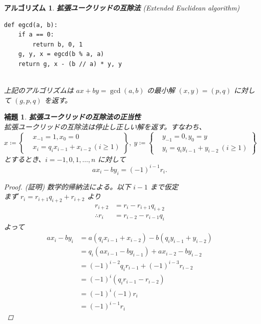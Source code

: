 \documentclass[12pt, a4j]{ltjsarticle}
\newtheorem{lem}[thm]{補題}
\newtheorem{alg}[thm]{アルゴリズム}
\begin{document}
\begin{alg} {\bf 拡張ユークリッドの互除法} (Extended Euclidean algorithm) \upshape
  \\
\begin{lstlisting}
def egcd(a, b):
    if a == 0:
        return b, 0, 1
    g, y, x = egcd(b % a, a)
    return g, x - (b // a) * y, y
\end{lstlisting}
\quad\\
上記のアルゴリズムは $ax + by = \gcd(a,b)$ の最小解 $(x, y) = (p, q)$ に対して $(g, p, q)$ を返す。
\end{alg}
\vspace{1cm}
\begin{lem} {\bf 拡張ユークリッドの互除法の正当性}　\\
拡張ユークリッドの互除法は停止し正しい解を返す。すなわち、
  \begin{equation}
  x \coloneqq \left\{
  \begin{aligned}
      &x_{-1} = 1, x_0 = 0 \\
      &x_i = q_ix_{i-1} + x_{i-2}\ (i\ge1)
  \end{aligned}
  \right\},\ y \coloneqq\left\{
  \begin{aligned}
      &y_{-1} = 0, y_0 = y \\
      &y_i = q_iy_{i-1} + y_{i-2}\ (i\ge1)
  \end{aligned}
  \right\}
  \end{equation}
とするとき、$i=-1,0,1,\ldots,n$ に対して
 \begin{equation}
   ax_i-by_i = (-1)^{i-1}r_i.
 \end{equation}
\begin{proof}(証明) 数学的帰納法による。以下 $i-1$ まで仮定\\
まず $r_i=r_{i+1}q_{i+2}+r_{i+2}$ より
\begin{align}
r_{i+2} &= r_i - r_{i+1}q_{i+2} \\
\therefore r_i &= r_{i-2} - r_{i-1}q_i
\end{align}
よって
\begin{align}
ax_i - by_i &= a(q_ix_{i-1}+x_{i-2}) - b(q_iy_{i-1}+y_{i-2}) \\
            &= q_i(ax_{i-1}-by_{i-1}) + ax_{i-2} - by_{i-2} \\
            &= (-1)^{i-2}q_ir_{i-1} + (-1)^{i-3}r_{i-2} \\
            &= (-1)^i(q_ir_{i-1}-r_{i-2}) \\
            &= (-1)^i (-1) r_i \\
            &= (-1)^{i-1} r_i
\end{align}
\end{proof}
\end{lem}
\end{document}
